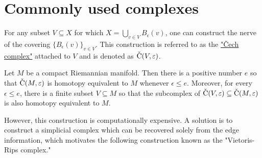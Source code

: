 


\section{Commonly used complexes}

\begin{defn}
	For any subset $V\subseteq X$ for which $X = \bigcup_{v\in V}B_\epsilon(v)$, one can construct the nerve of the covering $\{B_\epsilon(v)\}_{v\in V}$. This construction is referred to as the \underline{"\v{C}ech complex"} attached to $V$ and is denoted as $\operatorname{\check{C}}(V,\varepsilon)$.
\end{defn}

\begin{thm}
Let $M$ be a compact Riemannian manifold. Then there is a positive number $e$ so that $\operatorname{\check{C}}(M, \varepsilon)$ is homotopy equivalent to $M$ whenever $\epsilon \leq e$. Moreover, for every $ \epsilon \leq e$, there is a finite subset $V \subseteq M$ so that the subcomplex of $\operatorname{\check{C}}(V,\varepsilon) \subseteq \operatorname{\check{C}}(M, \varepsilon)$ is also homotopy equivalent to $M$.
\end{thm}

However, this construction is computationally expensive. A solution is to construct a simplicial complex which can be recovered solely from the edge information, which motivates the following construction known as the "Vietoris-Rips complex." 

